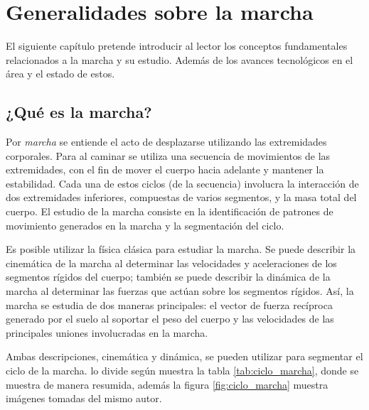 \chapter[Generalidades]{Generalidades sobre la marcha}

El siguiente capítulo pretende introducir al lector los conceptos fundamentales relacionados a la marcha y su estudio. Además de los avances tecnológicos en el área y el estado de estos.

\section{¿Qué es la marcha?}

Por \emph{marcha} se entiende el acto de desplazarse utilizando las extremidades corporales. Para \cite{perry} al caminar se utiliza una secuencia de movimientos de las extremidades, con el fin de mover el cuerpo hacia adelante y mantener la estabilidad. Cada una de estos ciclos (de la secuencia) involucra la interacción de dos extremidades inferiores, compuestas de varios segmentos, y la masa total del cuerpo. El estudio de la marcha consiste en la identificación de patrones de movimiento generados en la marcha y la segmentación del ciclo.

Es posible utilizar la física clásica para estudiar la marcha. Se puede describir la cinemática de la marcha al determinar las velocidades y aceleraciones de los segmentos rígidos del cuerpo; también se puede describir la dinámica de la marcha al determinar las fuerzas que actúan sobre los segmentos rígidos. Así, la marcha se estudia de dos maneras principales: el vector de fuerza recíproca generado por el suelo al soportar el peso del cuerpo y las velocidades de las principales uniones involucradas en la marcha. \citep{perry}

Ambas descripciones, cinemática y dinámica, se pueden utilizar para segmentar el ciclo de la marcha. \cite{perry} lo divide según muestra la tabla \ref{tab:ciclo_marcha}, donde se muestra de manera resumida, además la figura \ref{fig:ciclo_marcha} muestra imágenes tomadas del mismo autor. 

